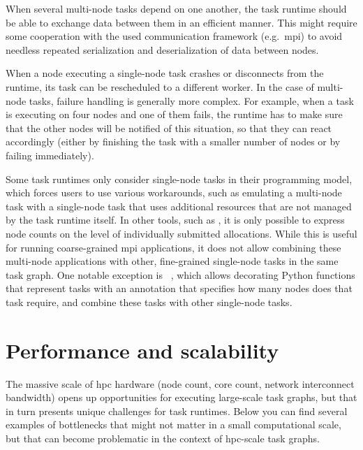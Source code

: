 \begin{description}[wide=0pt]
		When several multi-node tasks depend on one another, the task runtime should be able to exchange
		data between them in an efficient manner. This might require some cooperation with the used
		communication framework (e.g.\ \gls{mpi}) to avoid needless repeated serialization and
		deserialization of data between nodes.
	\item[Fault tolerance] When a node executing a single-node task crashes or disconnects from the runtime, its task can be
		rescheduled to a different worker. In the case of multi-node tasks, failure handling is generally
		more complex. For example, when a task is executing on four nodes and one of them fails, the
		runtime has to make sure that the other nodes will be notified of this situation, so that they can
		react accordingly (either by finishing the task with a smaller number of nodes or by failing
		immediately).
\end{description}

Some task runtimes only consider single-node tasks in their programming model, which forces users
to use various workarounds, such as emulating a multi-node task with a single-node task that uses
additional resources that are not managed by the task runtime itself. In other tools, such as
\autosubmit{}, it is only possible to express node counts on the level of individually
submitted allocations. While this is useful for running coarse-grained \gls{mpi}
applications, it does not allow combining these multi-node applications with other, fine-grained
single-node tasks in the same task graph. One notable exception is
\pycompss{}~\cite{pycompss}, which allows decorating Python functions that
represent tasks with an annotation that specifies how many nodes does that task require, and
combine these tasks with other single-node tasks.


\section{Performance and scalability}
The massive scale of \gls{hpc} hardware (node count, core count, network interconnect
bandwidth) opens up opportunities for executing large-scale task graphs, but that in turn presents
unique challenges for task runtimes. Below you can find several examples of bottlenecks that might
not matter in a small computational scale, but that can become problematic in the context of
\gls{hpc}-scale task graphs.

